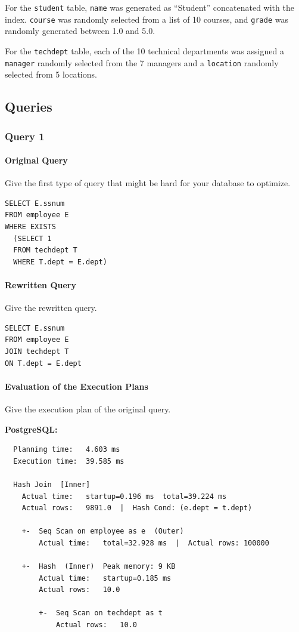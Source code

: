 \documentclass[11pt]{scrartcl}
\begin{document}
For the \texttt{student} table, \texttt{name} was generated as ``Student'' concatenated with the index. \texttt{course} was randomly selected from a list of 10 courses, and \texttt{grade} was randomly generated between 1.0 and 5.0.

For the \texttt{techdept} table, each of the 10 technical departments was assigned a \texttt{manager} randomly selected from the 7 managers and a \texttt{location} randomly selected from 5 locations.

\subsection*{Queries}

\subsubsection*{Query 1}

\paragraph{Original Query}

Give the first type of query that might be hard for your database to optimize.

\begin{lstlisting}[style=dbtsql]
SELECT E.ssnum 
FROM employee E 
WHERE EXISTS 
  (SELECT 1 
  FROM techdept T 
  WHERE T.dept = E.dept)
\end{lstlisting}

\paragraph{Rewritten Query}

Give the rewritten query.

\begin{lstlisting}[style=dbtsql]
SELECT E.ssnum 
FROM employee E 
JOIN techdept T 
ON T.dept = E.dept
\end{lstlisting}

\paragraph{Evaluation of the Execution Plans}

Give the execution plan of the original query.

\textbf{PostgreSQL:}

{\small
\parskip0pt\begin{verbatim}
  Planning time:   4.603 ms
  Execution time:  39.585 ms

  Hash Join  [Inner]
    Actual time:   startup=0.196 ms  total=39.224 ms
    Actual rows:   9891.0  |  Hash Cond: (e.dept = t.dept)

    +-  Seq Scan on employee as e  (Outer)
        Actual time:   total=32.928 ms  |  Actual rows: 100000

    +-  Hash  (Inner)  Peak memory: 9 KB
        Actual time:   startup=0.185 ms
        Actual rows:   10.0

        +-  Seq Scan on techdept as t
            Actual rows:   10.0
\end{verbatim}}
\end{document}
